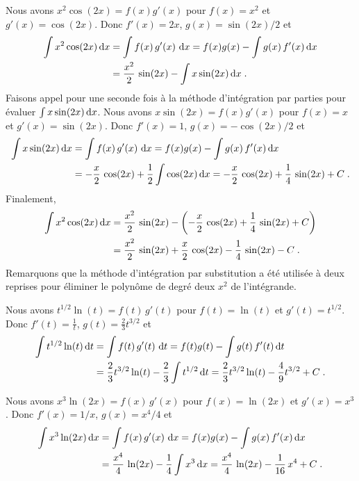 {\begin{egg}
 Nous avons $x^2 \cos(2x) = f(x) g'(x)$ pour $f(x)=x^2$ et
$g'(x)= \cos(2x)$.  Donc $f'(x) = 2x$, $g(x)=\sin(2x)/2$ et
\begin{align*}
\int x^2 \cos(2x)\,\mathrm{d}x &= \int f(x)\,g'(x)\,\,\mathrm{d}x
= f(x)g(x) - \int g(x)\,f'(x) \,\mathrm{d}x \\
&= \frac{x^2}{2}\,\sin(2x) - \int x\sin(2x) \,\mathrm{d}x \; .
\end{align*}
Faisons appel pour une seconde fois à la méthode d'intégration par
parties pour évaluer $\int x\sin(2x)  \,\mathrm{d}x$.  Nous avons
$x\sin(2x) = f(x)g'(x)$ pour $f(x)=x$ et $g'(x) = \sin(2x)$.  Donc
$f'(x) = 1$, $g(x) = -\cos(2x)/2$ et
\begin{align*}
\int x\sin(2x) \,\mathrm{d}x &= \int f(x)\,g'(x)\,\,\mathrm{d}x
= f(x)g(x) - \int g(x)\,f'(x) \,\mathrm{d}x \\
&= -\frac{x}{2}\,\cos(2x) + \frac{1}{2}\int \cos(2x) \,\mathrm{d}x
= -\frac{x}{2}\,\cos(2x) + \frac{1}{4} \, \sin(2x) + C \; .
\end{align*}
Finalement,
\begin{align*}
\int x^2 \cos(2x)\,\mathrm{d}x &= \frac{x^2}{2}\,\sin(2x)
-\left( -\frac{x}{2}\,\cos(2x) + \frac{1}{4} \, \sin(2x) + C \right) \\
&= \frac{x^2}{2}\,\sin(2x) + \frac{x}{2}\,\cos(2x)
- \frac{1}{4} \, \sin(2x) - C \; .
\end{align*}
Remarquons que la méthode d'intégration par substitution a été
utilisée à deux reprises pour éliminer le polynôme de degré deux $x^2$ de
l'intégrande.

 Nous avons $t^{1/2} \ln(t) = f(t)\,g'(t)$ pour $f(t)=\ln(t)$ et
$g'(t)= t^{1/2}$.  Donc $\displaystyle f'(t) = \frac{1}{t}$,
$\displaystyle g(t) = \frac{2}{3} t^{3/2}$ et
\begin{align*}
\int t^{1/2} \ln(t)  \,\mathrm{d}t &= \int f(t)\,g'(t)\,\,\mathrm{d}t
= f(t)g(t) - \int g(t)\,f'(t) \,\mathrm{d}t \\
&= \frac{2}{3} t^{3/2} \ln(t) - \frac{2}{3} \int t^{1/2} \,\mathrm{d}t
= \frac{2}{3} t^{3/2} \ln(t) - \frac{4}{9} t^{3/2} + C \; .
\end{align*}

 Nous avons $x^3 \ln(2x) = f(x)\,g'(x)$ pour $f(x)=\ln(2x)$ et
$g'(x)=x^3$.  Donc $f'(x) = 1/x$, $g(x) = x^4/4$ et
\begin{align*}
\int x^3 \ln(2x)  \,\mathrm{d}x &= \int f(x)\,g'(x)\,\,\mathrm{d}x
= f(x)g(x) - \int g(x)\,f'(x) \,\mathrm{d}x \\
&= \frac{x^4}{4}\,\ln(2x) - \frac{1}{4}\int x^3 \,\mathrm{d}x
= \frac{x^4}{4}\,\ln(2x) - \frac{1}{16} \, x^4 + C \; .
\end{align*}


\end{egg}}
